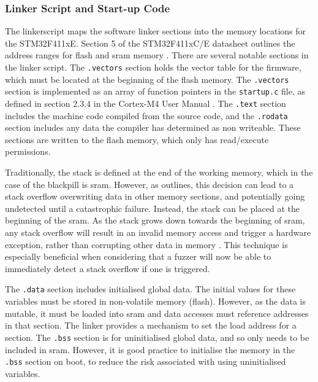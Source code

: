 \documentclass[../report.tex]{subfiles}
\begin{document}
\subsubsection{Linker Script and Start-up Code} \label{sec:linkerscript}

The linkerscript maps the software linker sections into the memory locations
for the STM32F411xE. Section 5 of the STM32F411xC/E datasheet outlines the
address ranges for flash and sram memory \citep{stm32f4_datasheet}. There are
several notable sections in the linker script. The \lstinline|.vectors| section
holds the vector table for the firmware, which must be located at the beginning
of the flash memory. The \lstinline|.vectors| section is implemented as an
array of function pointers in the \lstinline|startup.c| file, as defined in
section 2.3.4 in the Cortex-M4 User Manual \citep{armcm4_manual}. The
\lstinline|.text| section includes the machine code compiled from the source
code, and the \lstinline|.rodata| section includes any data the compiler has
determined as non writeable. These sections are written to the flash memory,
which only has read/execute permissions.

Traditionally, the stack is defined at the end of the working memory, which in
the case of the blackpill is sram. However, as \citet{miro_stack} outlines,
this decision can lead to a stack overflow overwriting data in other memory
sections, and potentially going undetected until a catastrophic failure.
Instead, the stack can be placed at the beginning of the sram. As the stack
grows down towards the beginning of sram, any stack overflow will result in an
invalid memory access and trigger a hardware exception, rather than corrupting
other data in memory \citep{miro_stack}. This technique is especially
beneficial when considering that a fuzzer will now be able to immediately
detect a stack overflow if one is triggered.

The \lstinline|.data| section includes initialised global data. The initial
values for these variables must be stored in non-volatile memory (flash).
However, as the data is mutable, it must be loaded into sram and data accesses
must reference addresses in that section. The linker provides a mechanism to
set the load address for a section. The \lstinline|.bss| section is for
uninitialised global data, and so only needs to be included in sram. However,
it is good practice to initialise the memory in the \lstinline|.bss| section on
boot, to reduce the risk associated with using uninitialised variables.
\end{document}
